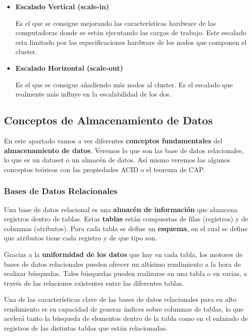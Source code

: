 \begin{itemize}
	\begin{itemize}
		\item \textbf{Escalado Vertical (scale-in)}
		
		Es el que se consigue mejorando las características hardware de las computadoras donde se están ejecutando las cargas de trabajo. Este escalado esta limitado por las especificaciones hardware de los nodos que componen el cluster. 
		
		\item \textbf{Escalado Horizontal (scale-out)}
		
		Es el que se consigue añadiendo más nodos al cluster. Es el escalado que realmente más influye en la escalabilidad de los dos.
		
	\end{itemize}
\end{itemize}

\subsection{Conceptos de Almacenamiento de Datos}
En este apartado vamos a ver diferentes \textbf{conceptos fundamentales} del \textbf{almacenamiento de datos}. Veremos lo que son las base de datos relacionales, lo que es un dataset o un almacén de datos. Así mismo veremos las algunos conceptos teóricos con las propiedades ACID o el teorema de CAP.

\subsubsection{Bases de Datos Relacionales}
Una base de datos relacional es una \textbf{almacén de información} que almacena registros dentro de tablas. Estas \textbf{tablas} están compuestas de filas (registros) y de columnas (atributos). Para cada tabla se define un \textbf{esquema}, en el cual se define que atributos tiene cada registro y de que tipo son. 

Gracias a la \textbf{uniformidad de los datos} que hay en cada tabla, los motores de bases de datos relacionales pueden ofrecer un altísimo rendimiento a la hora de realizar búsquedas. Tales búsquedas pueden realizarse en una tabla o en varias, a través de las relaciones existentes entre las diferentes tablas.

Una de las características clave de las bases de datos relacionales para su alto rendimiento es su capacidad de generar índices sobre columnas de tablas, lo que acelerá tanto la búsqueda de elementos dentro de la tabla como en el enlazado de registros de las distintas tablas que están relacionadas.


